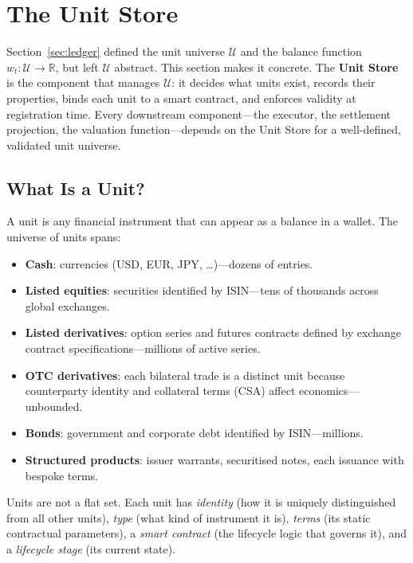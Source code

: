 \documentclass[11pt,a4paper]{article}
\begin{document}
\clearpage
\section{The Unit Store}
\label{sec:unit-store}

Section~\ref{sec:ledger} defined the unit universe $\mathcal{U}$ and the balance function $w_t : \mathcal{U} \to \mathbb{R}$, but left $\mathcal{U}$ abstract. This section makes it concrete. The \textbf{Unit Store} is the component that manages $\mathcal{U}$: it decides what units exist, records their properties, binds each unit to a smart contract, and enforces validity at registration time. Every downstream component---the executor, the settlement projection, the valuation function---depends on the Unit Store for a well-defined, validated unit universe.

\subsection{What Is a Unit?}

A unit is any financial instrument that can appear as a balance in a wallet. The universe of units spans:

\begin{itemize}[nosep]
\item \textbf{Cash}: currencies (USD, EUR, JPY, \ldots)---dozens of entries.
\item \textbf{Listed equities}: securities identified by ISIN---tens of thousands across global exchanges.
\item \textbf{Listed derivatives}: option series and futures contracts defined by exchange contract specifications---millions of active series.
\item \textbf{OTC derivatives}: each bilateral trade is a distinct unit because counterparty identity and collateral terms (CSA) affect economics---unbounded.
\item \textbf{Bonds}: government and corporate debt identified by ISIN---millions.
\item \textbf{Structured products}: issuer warrants, securitised notes, each issuance with bespoke terms.
\end{itemize}

\noindent Units are not a flat set. Each unit has \emph{identity} (how it is uniquely distinguished from all other units), \emph{type} (what kind of instrument it is), \emph{terms} (its static contractual parameters), a \emph{smart contract} (the lifecycle logic that governs it), and a \emph{lifecycle stage} (its current state).
\end{document}
